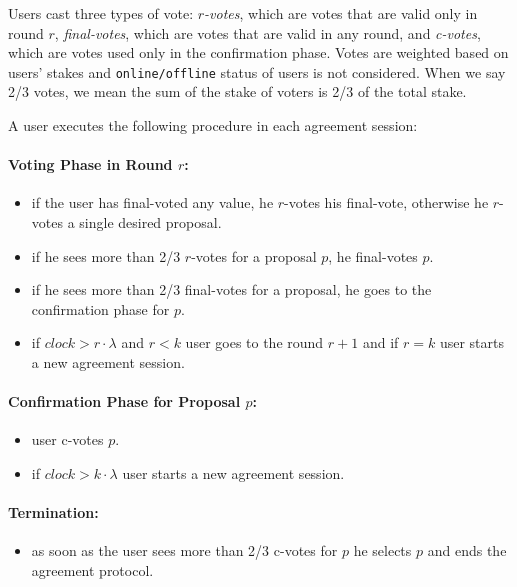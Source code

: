 Users cast three types of vote: \emph{$r$-votes}, which are votes that are valid only in
round $r$, \emph{final-votes}, which are votes that are valid in any round, and \emph{c-votes}, which are votes
used only in the confirmation phase. Votes are weighted based on users' stakes and \texttt{online/offline} status of
users is not considered. When we say 2/3 votes, we mean the sum of the stake of voters is 2/3 of the total stake.

\newpage
A user executes the following procedure in each agreement session:
\paragraph{Voting Phase in Round $r$:}
\begin{itemize}
    \item if the user has final-voted any value, he $r$-votes his final-vote, otherwise he $r$-votes a single desired
    proposal.
    \item if he sees more than 2/3 $r$-votes for a proposal $p$, he final-votes $p$.
    \item if he sees more than 2/3 final-votes for a proposal, he goes to the confirmation phase for $p$.
    \item if $clock > r \cdot \lambda$ and $r < k$ user goes to the round $r + 1$ and if $r = k$ user starts a
    new agreement session.
\end{itemize}

\paragraph{Confirmation Phase for Proposal $p$:}
\begin{itemize}
    \item user c-votes $p$.
    \item if $clock > k \cdot \lambda$ user starts a new agreement session.
\end{itemize}

\paragraph{Termination:}
\begin{itemize}
    \item as soon as the user sees more than 2/3 c-votes for $p$ he selects $p$ and ends the agreement protocol.
\end{itemize}

